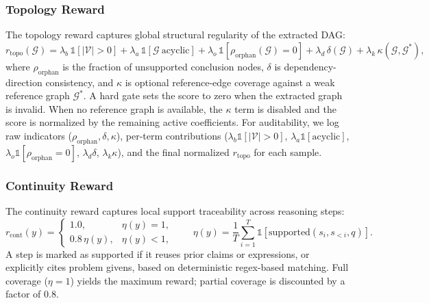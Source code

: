 \subsubsection{Topology Reward}
The topology reward captures global structural regularity of the extracted DAG:
\begin{equation}
\label{eq:r_topo}
r_{\mathrm{topo}}(\mathcal{G}) =
\lambda_b\,\mathbb{1}[|\mathcal{V}|>0]
+\lambda_a\,\mathbb{1}[\mathcal{G}\ \text{acyclic}]
+\lambda_o\,\mathbb{1}[\rho_{\mathrm{orphan}}(\mathcal{G})=0]
+\lambda_d\,\delta(\mathcal{G})
+\lambda_k\,\kappa(\mathcal{G},\mathcal{G}^{*}),
\end{equation}
where $\rho_{\mathrm{orphan}}$ is the fraction of unsupported conclusion nodes, $\delta$ is dependency-direction consistency, and $\kappa$ is optional reference-edge coverage against a weak reference graph $\mathcal{G}^{*}$.
A hard gate sets the score to zero when the extracted graph is invalid.
When no reference graph is available, the $\kappa$ term is disabled and the score is normalized by the remaining active coefficients.
For auditability, we log raw indicators ($\rho_{\mathrm{orphan}},\delta,\kappa$), per-term contributions
($\lambda_b\mathbb{1}[|\mathcal{V}|>0]$, $\lambda_a\mathbb{1}[\mathrm{acyclic}]$, $\lambda_o\mathbb{1}[\rho_{\mathrm{orphan}}=0]$, $\lambda_d\delta$, $\lambda_k\kappa$),
and the final normalized $r_{\mathrm{topo}}$ for each sample.

\subsubsection{Continuity Reward}
The continuity reward captures local support traceability across reasoning steps:
\begin{equation}
\label{eq:r_cont}
r_{\mathrm{cont}}(y)=
\begin{cases}
1.0, & \eta(y)=1,\\
0.8\,\eta(y), & \eta(y)<1,
\end{cases}
\qquad
\eta(y)=\frac{1}{T}\sum_{i=1}^{T}\mathbb{1}[\mathrm{supported}(s_i,s_{<i},q)].
\end{equation}
A step is marked as supported if it reuses prior claims or expressions, or explicitly cites problem givens, based on deterministic regex-based matching.
Full coverage ($\eta{=}1$) yields the maximum reward; partial coverage is discounted by a factor of $0.8$.


